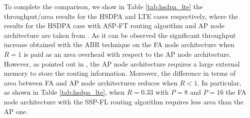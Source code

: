\documentclass[10pt,twocolumn,journal]{IEEEtran}
\begin{document}
To complete the comparison, we show in Table \ref{tab:hsdpa_lte} the throughput/area results for the HSDPA and LTE 
cases respectively, where the results for the HSDPA case with ASP-FT routing algorithm and AP node architecture 
are taken from \cite{martina_MPMS11}. As it can be observed the significant throughput increase obtained with the
ABR technique on the FA node architecture when $R=1$ is paid as an area overhead with respect to the AP node architecture. 
However, as pointed out in \cite{martina_MPMS11}, the AP node architecture requires a large external memory to 
store the routing information. Moreover, the difference in terms of area between FA and AP node architectures reduces 
when $R<1$. In particular, as shown in Table \ref{tab:hsdpa_lte}, when $R=0.33$ with $P=8$ and $P=16$ the FA node 
architecture with the SSP-FL routing algorithm requires less area than the AP one.
\end{document}
